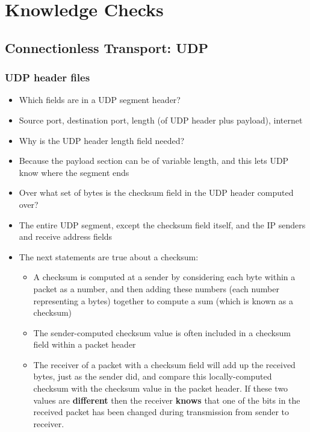 \section*{Knowledge Checks}

\subsection*{Connectionless Transport: UDP}
    \subsubsection*{UDP header files}
    \begin{itemize}
        \item Which fields are in a UDP segment header?
        \item[] Source port, destination port, length (of UDP header plus payload),
        internet 
        \item Why is the UDP header length field needed?
        \item[] Because the payload section can be of variable length, and this lets UDP know where the
        segment ends
        \item Over what set of bytes is the checksum field in the UDP header computed over?
        \item[] The entire UDP segment, except the checksum field itself, and the IP senders and receive
        address fields
        \item The next statements are true about a checksum:
        \begin{itemize}
            \item A checksum is computed at a sender by considering each byte within a packet
            as a number, and then adding these numbers (each number representing a bytes)
            together to compute a sum (which is known as a checksum)
            \item The sender-computed checksum value is often included in a checksum field
            within a packet header
            \item The receiver of a packet with a checksum field will add up the received
            bytes, just as the sender did, and compare this locally-computed checksum with the
            checksum value in the packet header. If these two values are \textbf{different}
            then the receiver \textbf{knows} that one of the bits in the received packet has been changed
            during transmission from sender to receiver.
        \end{itemize}

\end{itemize}

